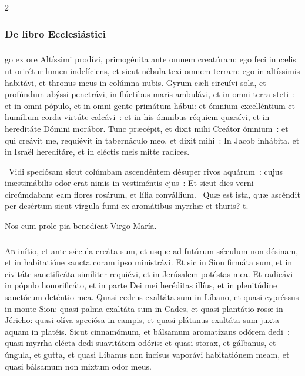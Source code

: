 \documentclass[9pt,twoside]{extarticle}
\begin{document}
\begin{multicols}{2}
\subsubsection*{\center \normalfont De libro Ecclesiástici}
\subsubsection*{}
go ex ore Altíssimi prodívi, primogénita ante omnem creatúram:
ego feci in cælis ut orirétur lumen indefíciens, et sicut nébula texi omnem terram:
ego in altíssimis habitávi, et thronus meus in colúmna nubis.
Gyrum cæli circuívi sola, et profúndum abýssi penetrávi, in flúctibus maris ambulávi,
et in omni terra steti~: et in omni pópulo,
et in omni gente primátum hábui:
et ómnium excelléntium et humílium corda virtúte calcávi~: et in his ómnibus réquiem quæsívi, et in hereditáte Dómini morábor.
Tunc præcépit, et dixit mihi Creátor ómnium~: et qui creávit me, requiévit in tabernáculo meo,
et dixit mihi~: In Jacob inhábita, et in Israël hereditáre, et in eléctis meis mitte radíces.

\begin{tightlist}{}
\item {}~Vidi speciósam sicut colúmbam ascendéntem désuper rivos aquárum~: cujus inæstimábilis odor erat nimis in vestiméntis ejus~: \textred{*} Et sicut dies verni circúmdabant eam flores rosárum, et lília convállium. ~Quæ est ista, quæ ascéndit per desértum sicut vírgula fumi ex aromátibus myrrhæ et thuris? t.
\item {\small {} Nos cum prole pia benedícat Virgo María.}
\end{tightlist}

\subsubsection*{\center {}}
\lettrine{A}b inítio, et ante sǽcula creáta sum, et usque ad futúrum sǽculum non désinam, et in habitatióne sancta coram ipso ministrávi.
Et sic in Sion firmáta sum, et in civitáte sanctificáta simíliter requiévi, et in Jerúsalem potéstas mea.
Et radicávi in pópulo honorificáto, et in parte Dei mei heréditas illíus, et in plenitúdine sanctórum deténtio mea.
Quasi cedrus exaltáta sum in Líbano, et quasi cypréssus in monte Sion:
quasi palma exaltáta sum in Cades, et quasi plantátio rosæ in Jéricho:
quasi olíva speciósa in campis, et quasi plátanus exaltáta sum juxta aquam in platéis.
Sicut cinnamómum, et bálsamum aromatízans odórem dedi~: quasi myrrha elécta dedi suavitátem odóris:
et quasi storax, et gálbanus, et úngula, et gutta, et quasi Líbanus non incísus vaporávi habitatiónem meam, et quasi bálsamum non mixtum odor meus.


\end{multicols}
\end{document}
